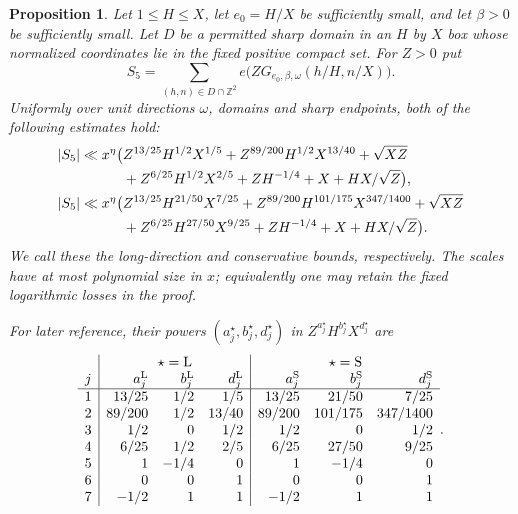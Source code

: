 \documentclass[11pt,a4paper]{article}
\numberwithin{equation}{section}
\newtheorem{proposition}[theorem]{Proposition}
\theoremstyle{remark}
\newcommand{\Z}{\mathbb Z}
\begin{document}
\begin{proposition}\label{prop:L5}
Let $1\le H\le X$, let $e_0=H/X$ be sufficiently small, and let $\beta>0$
be sufficiently small. Let $D$ be a permitted sharp domain in an $H$ by $X$
box whose normalized coordinates lie in the fixed positive compact set.
For $Z>0$ put
\[
 S_5=\sum_{(h,n)\in D\cap\Z^2}
       e\bigl(ZG_{e_0,\beta,\omega}(h/H,n/X)\bigr).
\]
Uniformly over unit directions $\omega$, domains and sharp endpoints,
both of the following estimates hold:
\begin{align}
 |S_5|\ll x^\eta\bigl(&Z^{13/25}H^{1/2}X^{1/5}
       +Z^{89/200}H^{1/2}X^{13/40}+\sqrt{XZ}\notag\\
       &+Z^{6/25}H^{1/2}X^{2/5}
       +ZH^{-1/4}+X+HX/\sqrt Z\bigr),\label{eq:L5}\\
 |S_5|\ll x^\eta\bigl(&Z^{13/25}H^{21/50}X^{7/25}
       +Z^{89/200}H^{101/175}X^{347/1400}+\sqrt{XZ}\notag\\
       &+Z^{6/25}H^{27/50}X^{9/25}
       +ZH^{-1/4}+X+HX/\sqrt Z\bigr).\label{eq:L5safe}
\end{align}
We call these the long-direction and conservative bounds, respectively.
The scales have at most polynomial size in $x$; equivalently one may
retain the fixed logarithmic losses in the proof.

For later reference, their powers $(a_j^\star,b_j^\star,d_j^\star)$ in
$Z^{a_j^\star}H^{b_j^\star}X^{d_j^\star}$ are
\begin{equation}\label{eq:local-powers}
\begin{array}{c|rrr|rrr}
 &\multicolumn{3}{c|}{\star=\mathrm L}
 &\multicolumn{3}{c}{\star=\mathrm S}\\
 j&a_j^{\mathrm L}&b_j^{\mathrm L}&d_j^{\mathrm L}
  &a_j^{\mathrm S}&b_j^{\mathrm S}&d_j^{\mathrm S}\\ \hline
 1&13/25&1/2&1/5&13/25&21/50&7/25\\
 2&89/200&1/2&13/40&89/200&101/175&347/1400\\
 3&1/2&0&1/2&1/2&0&1/2\\
 4&6/25&1/2&2/5&6/25&27/50&9/25\\
 5&1&-1/4&0&1&-1/4&0\\
 6&0&0&1&0&0&1\\
 7&-1/2&1&1&-1/2&1&1
\end{array}.
\end{equation}
\end{proposition}
\end{document}
